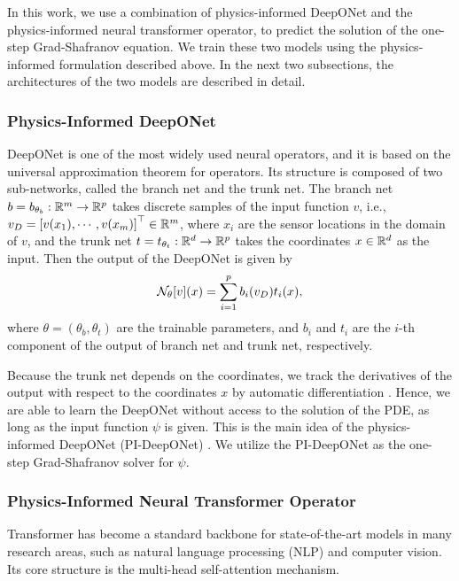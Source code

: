 In this work, we use a combination of physics-informed DeepONet 
and the physics-informed neural transformer operator,
to predict the solution of the one-step Grad-Shafranov equation.
We train these two models using the physics-informed formulation described above. 
In the next two subsections, the architectures of the two models are described in detail.

\subsubsection{Physics-Informed DeepONet}

DeepONet \cite{DeepONet} is one of the most widely used neural operators, 
and it is based on the universal approximation theorem for operators. 
Its structure is composed of two sub-networks, called the branch net and the trunk net.
The branch net $b = b_{\theta_b}: \bb{R}^m \to \bb{R}^p$ takes discrete samples of the input function $v$, i.e., $v_D = \left[
  v(x_1), \cdots, v(x_m)
\right]^\top \in \bb{R}^m$, where $x_i$ are the sensor locations in the domain of $v$,
and the trunk net $t = t_{\theta_t}: \bb{R}^d \to \bb{R}^p$ takes the coordinates $x \in \bb{R}^d$ as the input. 
Then the output of the DeepONet is given by
\[ \cal{N}_\theta[v](x) = \sum_{i=1}^p b_i(v_D) t_i (x), \]
where $\theta = (\theta_b, \theta_t)$ are the trainable parameters,
and $b_i$ and $t_i$ are the $i$-th component of the output of branch net and trunk net, respectively.

Because the trunk net depends on the coordinates, we track the derivatives of the output 
with respect to the coordinates $x$ by automatic differentiation \cite{autodiff}. 
Hence, we are able to learn the DeepONet without access to the solution of the PDE,
as long as the input function $\psi$ is given. 
This is the main idea of the physics-informed DeepONet (PI-DeepONet) \cite{PIDeepONet}. 
We utilize the PI-DeepONet as the one-step Grad-Shafranov solver for $\psi$.

\subsubsection{Physics-Informed Neural Transformer Operator}

Transformer \cite{transformer} has become a standard backbone for state-of-the-art models in 
many research areas, such as natural language processing (NLP) and computer vision.
Its core structure is the multi-head self-attention mechanism.

